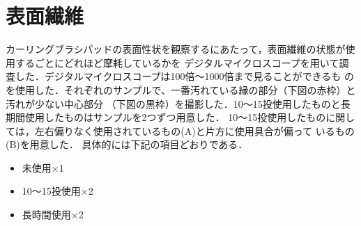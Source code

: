 \documentclass[main]{subfiles}
\begin{document}
\section{表面繊維}

カーリングブラシパッドの表面性状を観察するにあたって，表面繊維の状態が使用するごとにどれほど摩耗しているかを
デジタルマイクロスコープを用いて調査した．デジタルマイクロスコープは100倍～1000倍まで見ることができるも
のを使用した．それぞれのサンプルで、一番汚れている縁の部分（下図の赤枠）と汚れが少ない中心部分
（下図の黒枠）を撮影した．10～15投使用したものと長期間使用したものはサンプルを2つずつ用意した．
10～15投使用したものに関しては，左右偏りなく使用されているもの(A)と片方に使用具合が偏って
いるもの(B)を用意した．
具体的には下記の項目どおりである．

\begin{itemize}
    \item 未使用×1
    \item 10～15投使用×2
    \item 長時間使用×2
\end{itemize}
\end{document}
